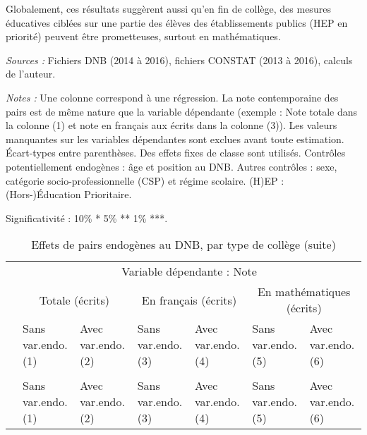 \documentclass[
]{book}
\begin{document}
\quad Globalement, ces résultats suggèrent aussi qu'en fin de collège, des mesures éducatives ciblées sur une partie des élèves des établissements publics (HEP en priorité) peuvent être prometteuses, surtout en mathématiques.

\begin{landscape}\begingroup\fontsize{8}{10}\selectfont

\begin{ThreePartTable}
\begin{TableNotes}
\item \textit{Sources :} Fichiers DNB (2014 à 2016), fichiers CONSTAT (2013 à 2016), calculs de l'auteur.
\item \textit{Notes :} Une colonne correspond à une régression. La note contemporaine des pairs est de même nature que la variable dépendante (exemple : Note totale dans la colonne (1) et note en français aux écrits dans la colonne (3)). Les valeurs manquantes sur les variables dépendantes sont exclues avant toute estimation. Écart-types entre parenthèses. Des effets fixes de classe sont utilisés. Contrôles potentiellement endogènes : âge et position au DNB. Autres contrôles : sexe, catégorie socio-professionnelle (CSP) et régime scolaire. (H)EP : (Hors-)Éducation Prioritaire.
\item Significativité : 10\% * 5\% ** 1\% ***.
\end{TableNotes}
\begin{longtable}[t]{lllllll}
\caption{\label{tab:pepcmlmodelsstatutreseau}Effets de pairs endogènes au DNB, par type de collège}\\
\toprule
\multicolumn{1}{c}{} & \multicolumn{6}{c}{Variable dépendante : Note} \\
\cmidrule(l{3pt}r{3pt}){2-7}
\multicolumn{1}{c}{} & \multicolumn{2}{c}{Totale (écrits)} & \multicolumn{2}{c}{En français (écrits)} & \multicolumn{2}{c}{En mathématiques (écrits)} \\
\cmidrule(l{3pt}r{3pt}){2-3} \cmidrule(l{3pt}r{3pt}){4-5} \cmidrule(l{3pt}r{3pt}){6-7}
 & \makecell{Sans var.endo. \\ (1) } & \makecell{Avec var.endo. \\ (2) } & \makecell{Sans var.endo. \\ (3) } & \makecell{Avec var.endo. \\ (4) } & \makecell{Sans var.endo. \\ (5) } & \makecell{Avec var.endo. \\ (6) }\\
\midrule
\endfirsthead
\caption[]{\label{tab:pepcmlmodelsstatutreseau}Effets de pairs endogènes au DNB, par type de collège (suite)}\\
\toprule
 & \makecell{Sans var.endo. \\ (1) } & \makecell{Avec var.endo. \\ (2) } & \makecell{Sans var.endo. \\ (3) } & \makecell{Avec var.endo. \\ (4) } & \makecell{Sans var.endo. \\ (5) } & \makecell{Avec var.endo. \\ (6) }\\
\midrule
\endhead


\end{longtable}
\end{ThreePartTable}
\end{landscape}
\end{document}
